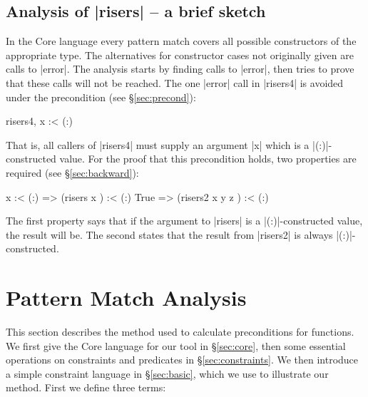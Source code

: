 \documentclass[preprint]{sigplanconf}
\begin{document}
\subsection{Analysis of |risers| -- a brief sketch}

In the Core language every pattern match covers all possible constructors of the appropriate type. The alternatives for constructor cases not originally given are calls to |error|. The analysis starts by finding calls to |error|, then tries to prove that these calls will not be reached. The one |error| call in |risers4| is avoided under the precondition (see \S\ref{sec:precond}):

\ignore\begin{code}
risers4, x :< (:)
\end{code}

\noindent That is, all callers of |risers4| must supply an argument |x| which is a |(:)|-constructed value. For the proof that this precondition holds, two properties are required (see \S\ref{sec:backward}):

\ignore\begin{code}
x :< (:)  => (risers x       ) :< (:)
True      => (risers2 x y z  ) :< (:)
\end{code}

\noindent The first property says that if the argument to |risers| is a |(:)|-constructed value, the result will be. The second states that the result from |risers2| is always |(:)|-constructed.

\begin{comment}
The analysis method works by calculating preconditions on the arguments for each function, which are sufficient to ensure the function will not call |error|. To calculate preconditions the method uses properties of functions, relating the arguments of a function to the result.
\end{comment}


\section{Pattern Match Analysis}
\label{sec:manipulate}

This section describes the method used to calculate preconditions for functions. We first give the Core language for our tool in \S\ref{sec:core}, then some essential operations on constraints and predicates in \S\ref{sec:constraints}. We then introduce a simple constraint language in \S\ref{sec:basic}, which we use to illustrate our method. First we define three terms:
\end{document}
